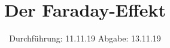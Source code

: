 
\setlength{\parindent}{0 pt}

\subject{V46}
\title{ Der Faraday-Effekt}
\date{%
  Durchführung: 11.11.19
  \hspace{3em}
  Abgabe: 13.11.19
}



\maketitle
\thispagestyle{empty}
\tableofcontents
\newpage







\printbibliography{}


